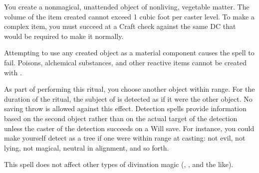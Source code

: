 \begin{spelleffect}
You create a nonmagical, unattended object of nonliving, vegetable matter. The volume of the item created cannot exceed 1 cubic foot per caster level. To make a complex item, you must succeed at a Craft check against the same DC that would be required to make it normally.
\end{spelleffect}
\begin{spellnotes}
Attempting to use any created object as a material component causes the spell to fail. Poisons, alchemical substances, and other reactive items cannot be created with .
\end{spellnotes}

\begin{comment}
\spellsection{Mirage Arcana}
\spellschool{Illusion (Glamer)}
\spelllvl{Arcane 5}
\spelltime{1 standard action}
\spellarea{One 20 ft. cube/level (S)}
\spelldur{\durext (D)}
\begin{spelleffect}
This spell functions like \spell{hallucinatory terrain}, except that it enables you to make any area appear to be something other than it is. The illusion includes audible, visual, tactile, and olfactory elements. Unlike hallucinatory terrain, the spell can alter the appearance of structures (or add them where none are present). Still, it can't disguise, conceal, or add creatures (though creatures within the area might hide themselves within the illusion just as they can hide themselves within a real location).
\end{spelleffect}
\end{comment}

\spellrng{\rngclose}
\begin{spelleffect}
As part of performing this ritual, you choose another object within range. For the duration of the ritual, the subject of  is detected as if it were the other object. No saving throw is allowed against this effect. Detection spells provide information based on the second object rather than on the actual target of the detection unless the caster of the detection succeeds on a Will save. For instance, you could make yourself detect as a tree if one were within range at casting: not evil, not lying, not magical, neutral in alignment, and so forth.
\end{spelleffect}
\begin{spellnotes}
This spell does not affect other types of divination magic (, , and the like).
\end{spellnotes}

